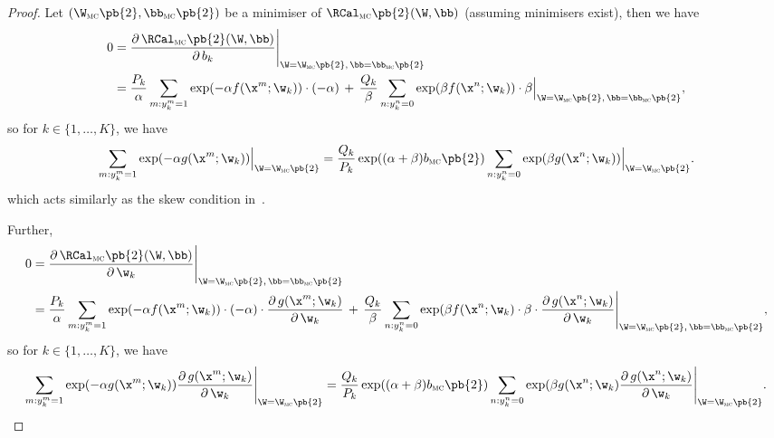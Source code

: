 \begin{proof}
Let $(\W_\textsc{mc}\pb{2}, \bb_\textsc{mc}\pb{2})$ be a minimiser of $\RCal_\textsc{mc}\pb{2}(\W, \bb)$ (assuming minimisers exist),
then we have
\begin{equation*}
\begin{aligned}
0 
&= \frac{\partial \, \RCal_\textsc{mc}\pb{2}(\W, \bb)} {\partial \, b_k} \Bigg|_{\W = \W_\textsc{mc}\pb{2}, \, \bb = \bb_\textsc{mc}\pb{2}} \\
&= \frac{P_k}{\alpha} \sum_{m: y_k^m = 1} \exp(-\alpha f(\x^m; \w_k)) \cdot (-\alpha) \, + \,
   \frac{Q_k}{\beta } \sum_{n: y_k^n = 0} \exp( \beta  f(\x^n; \w_k)) \cdot \beta 
   \Big|_{\W = \W_\textsc{mc}\pb{2}, \, \bb = \bb_\textsc{mc}\pb{2}},
\end{aligned}
\end{equation*}
so for $k \in \{1,\dots,K\}$, we have
\begin{equation}
\label{eq:skew_ml2}
\sum_{m: y_k^m = 1} \exp(-\alpha g(\x^m; \w_k))
\Big|_{\W = \W_\textsc{mc}\pb{2}}
= \frac{Q_k}{P_k} \exp((\alpha + \beta) b_\textsc{mc}\pb{2}) \sum_{n: y_k^n = 0} \exp( \beta g(\x^n; \w_k))
  \Big|_{\W = \W_\textsc{mc}\pb{2}}.
\end{equation}
which acts similarly as the skew condition in~\cite{ertekin2011equivalence}.

Further,
\begin{equation*}
\begin{aligned}
0 
&= \frac{\partial \, \RCal_\textsc{mc}\pb{2}(\W, \bb)} {\partial \, \w_k} \Bigg|_{\W = \W_\textsc{mc}\pb{2}, \, \bb = \bb_\textsc{mc}\pb{2}} \\
&= \frac{P_k}{\alpha} \sum_{m: y_k^m = 1} \exp(-\alpha f(\x^m; \w_k)) \cdot (-\alpha) \cdot
   \frac{\partial \, g(\x^m; \w_k)}{\partial \, \w_k} \, + \,
   \frac{Q_k}{\beta} \sum_{n: y_k^n = 0} \exp(\beta f(\x^n; \w_k) \cdot \beta \cdot
   \frac{\partial \, g(\x^n; \w_k)}{\partial \, \w_k} \Bigg|_{\W = \W_\textsc{mc}\pb{2}, \, \bb = \bb_\textsc{mc}\pb{2}},
\end{aligned}
\end{equation*}
so for $k \in \{1,\dots,K\}$, we have
\begin{equation}
\label{eq:grad_mc2_eq0}
\begin{aligned}
\sum_{m: y_k^m = 1} \exp(-\alpha g(\x^m; \w_k))
\frac{\partial \, g(\x^m; \w_k)}{\partial \, \w_k}
\Bigg|_{\W = \W_\textsc{mc}\pb{2}}
= \frac{Q_k}{P_k} \exp((\alpha + \beta) b_\textsc{mc}\pb{2}) \sum_{n: y_k^n = 0} \exp(\beta g(\x^n; \w_k)
  \frac{\partial \, g(\x^n; \w_k)}{\partial \, \w_k} 
  \Bigg|_{\W = \W_\textsc{mc}\pb{2}}.
\end{aligned}
\end{equation}


\end{proof}

